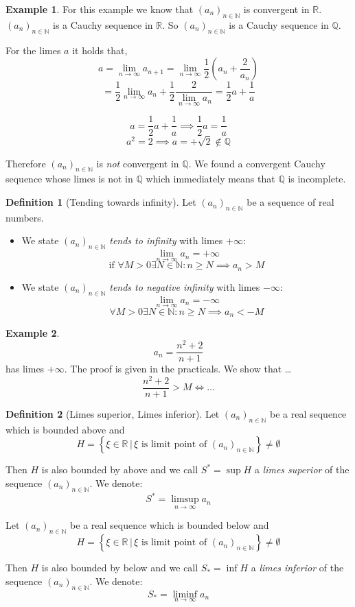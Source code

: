 \documentclass[a4paper,landscape,twocolumn]{article}
\theoremstyle{definition}
\newtheorem{defi}{Definition}
\newtheorem{ex}{Example}
\newcommand\setdef[2]{\left\{#1\,|\,#2\right\}}
\newcommand\seq[1]{{\left(#1\right)}_{n \in \mathbb N}}
\begin{document}
\begin{ex}
  For this example we know that $\seq{a_n}$ is convergent in $\mathbb R$.
  $\seq{a_n}$ is a Cauchy sequence in $\mathbb R$.
  So $\seq{a_n}$ is a Cauchy sequence in $\mathbb Q$.

  For the limes $a$ it holds that,
  \[ a = \lim_{n\to\infty} a_{n+1} = \lim_{n\to\infty} \frac12 \left(a_n + \frac{2}{a_n}\right) \]
  \[ = \frac12 \lim_{n\to\infty} a_n + \frac12 \frac{2}{\lim_{n\to\infty} a_n} = \frac12 a + \frac1a \]

  \[ a = \frac12 a + \frac1a \implies \frac12 a = \frac1a \]
  \[ a^2 = 2 \implies a = +\sqrt{2} \not\in \mathbb Q \]

  Therefore $\seq{a_n}$ is \emph{not} convergent in $\mathbb Q$.
  We found a convergent Cauchy sequence whose limes is not in $\mathbb Q$ which
  immediately means that $\mathbb Q$ is incomplete.
\end{ex}

\begin{defi}[Tending towards infinity]
  Let $\seq{a_n}$ be a sequence of real numbers.
  \begin{itemize}
    \item
      We state $\seq{a_n}$ \emph{tends to infinity} with limes $+\infty$:
      \[ \lim_{n\to\infty} a_n = +\infty \]
      \[ \text{if } \forall M > 0 \exists N \in \mathbb N: n \geq N \implies a_n > M \]
    \item
      We state $\seq{a_n}$ \emph{tends to negative infinity} with limes $-\infty$:
      \[ \lim_{n\to\infty} a_n = -\infty \]
      \[ \forall M > 0 \exists N \in \mathbb N: n \geq N \implies a_n < -M \]
  \end{itemize}
\end{defi}
\begin{ex}
  \[ a_n = \frac{n^2 + 2}{n+1} \]
  has limes $+\infty$.
  The proof is given in the practicals. We show that \dots
  \[ \frac{n^2 + 2}{n + 1} > M \iff \dots \]
\end{ex}

\begin{defi}[Limes superior, Limes inferior]
  Let $\seq{a_n}$ be a real sequence which is bounded above and
  \[ H = \setdef{\xi \in \mathbb R}{\xi \text{ is limit point of } \seq{a_n}} \neq \emptyset \]

  Then $H$ is also bounded by above and we call $S^* = \sup{H}$ a \emph{limes superior}
  of the sequence $\seq{a_n}$. We denote:
  \[ S^* = \limsup_{n\to\infty} a_n \]

  Let $\seq{a_n}$ be a real sequence which is bounded below and
  \[ H = \setdef{\xi \in \mathbb R}{\xi \text{ is limit point of } \seq{a_n}} \neq \emptyset \]

  Then $H$ is also bounded by below and we call $S_* = \inf{H}$ a \emph{limes inferior}
  of the sequence $\seq{a_n}$. We denote:
  \[ S_* = \liminf_{n\to\infty} a_n \]
\end{defi}
\end{document}
